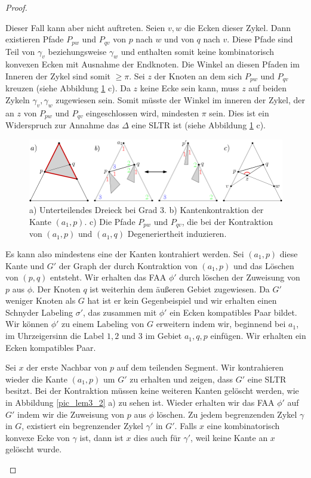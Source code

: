 \begin{proof}
\begin{description}[leftmargin =0pt, font = \bfseries]
Dieser Fall kann aber nicht auftreten. Seien $v,w$ die Ecken dieser Zykel. Dann existieren Pfade $P_{pw}$ und $P_{qv}$ von $p$ nach $w$ und von $q$ nach $v$. Diese Pfade sind Teil von $\gamma_v$ beziehungsweise $\gamma_w$ und enthalten somit keine kombinatorisch konvexen Ecken mit Ausnahme der Endknoten. Die Winkel an diesen Pfaden im Inneren der Zykel sind somit $\geq \pi$. Sei $z$ der Knoten an dem sich $P_{pw}$ und $P_{qv}$ kreuzen (siehe Abbildung \ref{pic_lem3_1} c). Da $z$ keine Ecke sein kann, muss $z$ auf beiden Zykeln $\gamma_v,\gamma_w$  zugewiesen sein. Somit müsste der Winkel im inneren der Zykel, der an $z$ von $P_{pw}$ und $P_{qv}$ eingeschlossen wird, mindesten $\pi$ sein. Dies ist ein Widerspruch zur Annahme das $\Delta$ eine SLTR ist (siehe Abbildung \ref{pic_lem3_1} c).

\begin{figure}[h]
	\centering
	  \includegraphics[width=1\textwidth]{lem3_1.png}
    	\caption{a) Unterteilendes Dreieck bei Grad 3. b) Kantenkontraktion der Kante $(a_1,p)$. c) Die Pfade $P_{pw}$ und $P_{qv}$, die bei der Kontraktion von $(a_1,p)$ und $(a_1,q)$ Degeneriertheit induzieren.}
    	\label{pic_lem3_1}
\end{figure}

Es kann also mindestens eine der Kanten kontrahiert werden. Sei $(a_1,p)$ diese Kante und $G'$ der Graph der durch Kontraktion von $(a_1,p)$ und das Löschen von $(p,q)$ entsteht. Wir erhalten das FAA $\phi'$ durch löschen der Zuweisung von $p$ aus $\phi$. Der Knoten $q$ ist weiterhin dem äußeren Gebiet zugewiesen. Da $G'$ weniger Knoten als $G$ hat ist er kein Gegenbeispiel und wir erhalten einen Schnyder Labeling $\sigma'$, das zusammen mit $\phi'$ ein Ecken kompatibles Paar bildet. Wir können $\phi'$ zu einem Labeling von $G$ erweitern indem wir, beginnend bei $a_1$, im Uhrzeigersinn die Label $1,2$ und $3$ im Gebiet $a_1,q,p$ einfügen. Wir erhalten ein Ecken kompatibles Paar.

\item[Fall 2] Sei $x$ der erste Nachbar von $p$ auf dem teilenden Segment. Wir kontrahieren wieder die Kante $(a_1,p)$ um $G'$ zu erhalten und zeigen, dass $G'$ eine SLTR besitzt. Bei der Kontraktion müssen keine weiteren Kanten gelöscht werden, wie in Abbildung \ref{pic_lem3_2} a) zu sehen ist. Wieder erhalten wir das FAA $\phi'$ auf $G'$ indem wir die Zuweisung von $p$ aus $\phi$ löschen. Zu jedem begrenzenden Zykel $\gamma$ in $G$, existiert ein begrenzender Zykel $\gamma'$ in $G'$. Falls $x$ eine kombinatorisch konvexe Ecke von $\gamma$ ist, dann ist $x$ dies auch für $\gamma'$, weil keine Kante an $x$ gelöscht wurde.


\end{description}
\end{proof}
